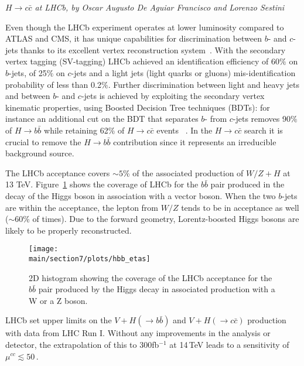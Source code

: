 \documentclass[../report.tex]{subfiles}
\providecommand{\main}{..}
\begin{document}
\begin{center}{\emph{$H \rightarrow c \bar{c}$ at LHCb, by Oscar Augusto De Aguiar Francisco and Lorenzo Sestini}} \end{center}

Even though the LHCb experiment operates at lower luminosity  compared to ATLAS and CMS, it has unique capabilities for discrimination between $b$- and $c$-jets thanks to its excellent vertex reconstruction system~\cite{Aaij:2015yqa}. With the secondary vertex tagging (SV-tagging) LHCb achieved an identification efficiency of 60$\%$ on $b$-jets, of 25$\%$ on $c$-jets and a light jets (light quarks or gluons) mis-identification probability of less than 0.2$\%$. Further discrimination between light and heavy jets and between $b$- and $c$-jets is achieved by exploiting the secondary vertex kinematic properties, using Boosted Decision Tree techniques (BDTs): for instance an additional cut on the BDT that separates $b$- from $c$-jets removes 90$\%$ of $H\rightarrow b \bar{b}$ while retaining 62$\%$ of $H\rightarrow c \bar{c}$ events  ~\cite{LHCb:2016yxg}. In the $H\rightarrow c \bar{c}$ search it is crucial to remove the $H\rightarrow b \bar{b}$ contribution since it represents an irreducible background source.

The LHCb acceptance covers $\sim 5$\% of the associated production of $W/Z+H$ at 13 TeV.  Figure~\ref{fig:hbbetas} shows the coverage of  LHCb for the $b\bar{b}$ pair produced in the decay of the  Higgs boson in association with a vector boson. When the two $b$-jets are within the acceptance, the lepton from $W/Z$ tends to be in acceptance as well ($\sim 60$\% of times). Due to the forward geometry, Lorentz-boosted Higgs bosons are  likely to be properly reconstructed.

\begin{figure}[ht]
	\centering
	\texttt{[image: \\main/section7/plots/hbb\_etas]}
	\caption{2D histogram showing the coverage of the LHCb acceptance for the $b\bar{b}$ pair produced by the Higgs decay in associated production with a W or a Z boson.}
	\label{fig:hbbetas}
\end{figure}

LHCb set  upper limits on the $V+H(\rightarrow b \bar{b})$ and $V+H(\rightarrow c \bar{c})$ production~\cite{LHCb:2016yxg} with data from LHC Run I.
Without any improvements in the analysis or detector, the extrapolation of this  to 300fb$^{-1}$ at 14\,TeV leads to a sensitivity of $\mu^{cc}\lesssim 50\,$. 
\end{document}

